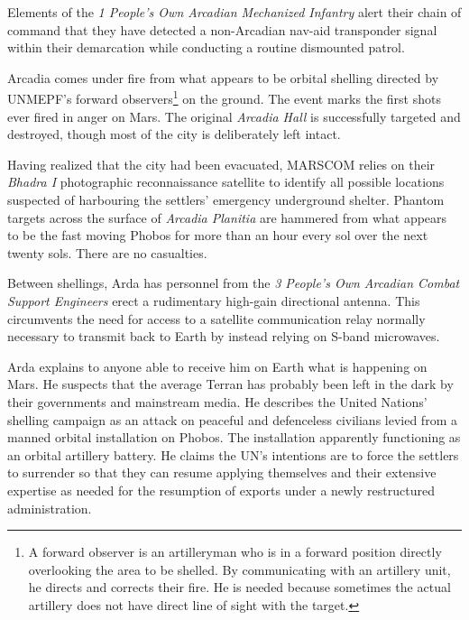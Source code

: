 

Elements of the {\it 1 People's Own Arcadian Mechanized Infantry} alert their chain of command that they have detected a non-Arcadian nav-aid transponder signal within their demarcation while conducting a routine dismounted patrol.
\StopTimelineDate

Arcadia comes under fire from what appears to be orbital shelling directed by UNMEPF's forward observers\footnote{A forward observer is an artilleryman who is in a forward position directly overlooking the area to be shelled. By communicating with an artillery unit, he directs and corrects their fire. He is needed because sometimes the actual artillery does not have direct line of sight with the target.} on the ground. The event marks the first shots ever fired in anger on Mars. The original {\it Arcadia Hall} is successfully targeted and destroyed, though most of the city is deliberately left intact. 

Having realized that the city had been evacuated, MARSCOM relies on their {\it Bhadra I} photographic reconnaissance satellite to identify all possible locations suspected of harbouring the settlers' emergency underground shelter. Phantom targets across the surface of {\it Arcadia Planitia} are hammered from what appears to be the fast moving Phobos for more than an hour every sol over the next twenty sols. There are no casualties.

Between shellings, Arda has personnel from the {\it 3 People's Own Arcadian Combat Support Engineers} erect a rudimentary high-gain directional antenna. This circumvents the need for access to a satellite communication relay normally necessary to transmit back to Earth by instead relying on S-band microwaves. 

Arda explains to anyone able to receive him on Earth what is happening on Mars. He suspects that the average Terran has probably been left in the dark by their governments and mainstream media. He describes the United Nations' shelling campaign as an attack on peaceful and defenceless civilians levied from a manned orbital installation on Phobos. The installation apparently functioning as an orbital artillery battery. He claims the UN's intentions are to force the settlers to surrender so that they can resume applying themselves and their extensive expertise as needed for the resumption of exports under a newly restructured administration.

